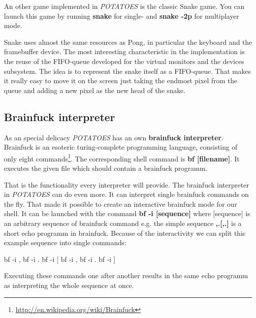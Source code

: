 \documentclass[11pt,a4paper]{scrartcl}
\makeatletter
\renewcommand*{\lstlistoflistings}{%
  \begingroup
    \if@twocolumn
      \@restonecoltrue\onecolumn
    \else
      \@restonecolfalse
    \fi
    \lol@heading
    \setlength{\parskip}{\z@}%
    \setlength{\parindent}{\z@}%
    \setlength{\parfillskip}{\z@ \@plus 1fil}%
    \@starttoc{lol}%
    \if@restonecol\twocolumn\fi
  \endgroup
}
\makeatother
\begin{document}
An other game implemented in \textit{POTATOES} is the classic Snake game. You can launch this game by running \textbf{snake} for single- and \textbf{snake -2p} for multiplayer mode.

Snake uses almost the same resources as Pong, in particular the keyboard and the framebuffer device. The most interesting characteristic in the implementation is the reuse of the FIFO-queue developed for the virtual monitors and the devices subsystem. The idea is to represent the snake itself as a FIFO-queue. That makes it really easy to move it on the screen just taking the endmost pixel from the queue and adding a new pixel as the new head of the snake.

\subsection{Brainfuck interpreter}

As an special delicacy \textit{POTATOES} has an own \textbf{brainfuck interpreter}. Brainfuck is an esoteric turing-complete programming language, consisting of only eight commands\footnote{\url{http://en.wikipedia.org/wiki/Brainfuck}}. The corresponding shell command is \textbf{bf [filename]}. It executes the given file which should contain a brainfuck programm. 

That is the functionality every interpreter will provide. The brainfuck interpreter in \textit{POTATOES} can do even more. It can interpret single brainfuck commands on the fly. That made it possible to create an interactive brainfuck mode for our shell. It can be launched with the command \textbf{bf -i [sequence]} where [sequence] is an arbitrary sequence of brainfuck command e.g. the simple sequence \textbf{,.[,.]} is a short echo programm in brainfuck.  Because of the interactivity we can split this example sequence into single commands:
\begin{code}[]
bf -i ,
bf -i .
bf -i [
bf -i ,
bf -i .
bf -i ]
\end{code}

Executing these commands one after another results in the same echo programm as interpreting the whole sequence at once.

\pagebreak
\end{document}
